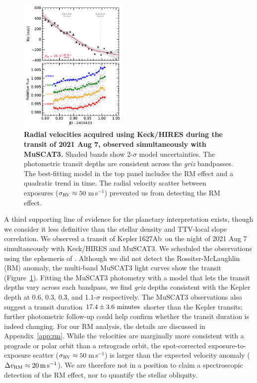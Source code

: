 \documentclass[12pt,modern,twocolumn,tighten]{aastex63}
\newcommand{\pn}{Kepler\,1627Ab} %
\newcommand{\ms}{\,m\,s$^{-1}$}
\begin{document}
\begin{figure}[t]
	\begin{center}
		\leavevmode
		\includegraphics[width=0.47\textwidth]{f4b.pdf}
	\end{center}
	\vspace{-0.7cm}
	\caption{
		{\bf Radial velocities acquired using Keck/HIRES during the transit of
			2021 Aug 7, observed simultaneously with MuSCAT3.}  Shaded bands
		show 2-$\sigma$ model uncertainties.  The photometric transit
		depths are consistent across the {\it griz} bandpasses.  The
		best-fitting model in the top panel includes the RM effect and a quadratic trend
		in time.  The radial velocity scatter
		between exposures ($\sigma_{\rm RV}\approx50$\ms) prevented us from detecting the RM
		effect.
		\label{fig:ground}
	}
\end{figure}

A third supporting line of evidence for the planetary interpretation
exists, though we consider it less definitive than the stellar
density and TTV-local slope correlation.  We observed a transit of
\pn\ on the night of 2021 Aug 7 simultaneously with Keck/HIRES and
MuSCAT3.  We scheduled the observations using the ephemeris of
\citet{holczer_transit_2016}.  Although we did not detect the
Rossiter-McLaughlin (RM) anomaly, the multi-band MuSCAT3 light curves
show the transit (Figure~\ref{fig:ground}).  Fitting
the MuSCAT3 photometry with a model that lets the transit depths vary
across each bandpass, we find {\it griz} depths consistent with the
Kepler depth at 0.6, 0.3, 0.3, and 1.1-$\sigma$ respectively.  The
MuSCAT3 observations also suggest a transit duration $17.4\pm3.6\ {\rm
minutes}$ shorter than the Kepler transits; further photometric
follow-up could help confirm whether the transit duration is indeed
changing.  For our RM analysis, the details are discussed in
Appendix~\ref{app:rm}.  While the velocities are marginally more
consistent with a prograde or polar orbit than a retrograde orbit, the
spot-corrected exposure-to-exposure scatter ($\sigma_{\rm RV}\approx
50$\ms) is larger than the expected velocity anomaly
($\Delta v_{\rm RM}\approx 20\,{\rm m\,s}^{-1}$).  We are therefore
not in a position to claim a spectroscopic detection of the RM effect,
nor to quantify the stellar obliquity.
\end{document}
